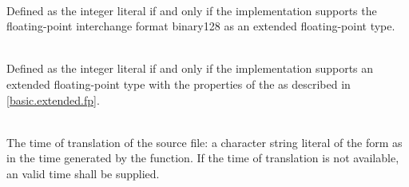 \begin{description}
\item
{}%
\\
Defined as the integer literal 
if and only if the implementation supports
the \IsoFloatUndated{} floating-point interchange format binary128
as an extended floating-point type.

\item
{}%
\\
Defined as the integer literal 
if and only if the implementation supports an extended floating-point type
with the properties of the  
as described in \ref{basic.extended.fp}.

\item
{}%
\\
The time of translation of the source file:
a character string literal of the form
as in the time generated by the
function.
If the time of translation is not available,
an  valid time shall be supplied.
\end{description}

